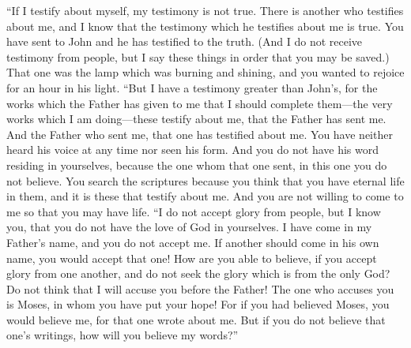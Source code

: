 \begin{biblechapter}
 “If I testify about myself, my testimony is not true.
\verse There is another who testifies about me, and I know that the testimony which he testifies about me is true.
\verse You have sent to John and he has testified to the truth.
\verse (And I do not receive testimony from people, but I say these things in order that you may be saved.)
\verse That one was the lamp which was burning and shining, and you wanted to rejoice for an hour in his light.
\verse “But I have a testimony greater than John’s, for the works which the Father has given to me that I should complete them—the very works which I am doing—these testify about me, that the Father has sent me.
\verse And the Father who sent me, that one has testified about me. You have neither heard his voice at any time nor seen his form.
\verse And you do not have his word residing in yourselves, because the one whom that one sent, in this one you do not believe.
\verse You search the scriptures because you think that you have eternal life in them, and it is these that testify about me.
\verse And you are not willing to come to me so that you may have life.
\verse “I do not accept glory from people,
\verse but I know you, that you do not have the love of God in yourselves.
\verse I have come in my Father’s name, and you do not accept me. If another should come in his own name, you would accept that one!
\verse How are you able to believe, if you accept glory from one another, and do not seek the glory which is from the only God?
\verse Do not think that I will accuse you before the Father! The one who accuses you is Moses, in whom you have put your hope!
\verse For if you had believed Moses, you would believe me, for that one wrote about me.
\verse But if you do not believe that one’s writings, how will you believe my words?”
\end{biblechapter}

